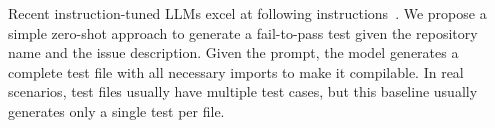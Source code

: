 Recent instruction-tuned LLMs excel at following
instructions~\cite{peng2023instruction,zhang2023instruction}. We propose a
simple zero-shot approach to generate a fail-to-pass test given the repository
name and the issue description.%
Given the prompt, the model generates a complete test file with all necessary imports to
make it compilable. In real scenarios, test files usually have multiple test
cases, but this baseline usually generates only a single test per file. 

